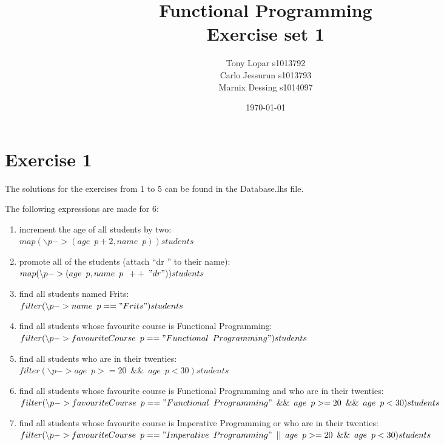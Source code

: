 \documentclass{article}
\begin{document}
\title{Functional Programming \\ Exercise set 1}
\date{\today}
\author{Tony Lopar s1013792 \\ Carlo Jessurun s1013793 \\ Marnix Dessing s1014097}
\maketitle

\section*{Exercise 1}
The solutions for the exercises from 1 to 5 can be found in the Database.lhs file.

The following expressions are made for 6:
\begin{enumerate}[label=\alph*)]
  \item increment the age of all students by two: \\
  $map (\backslash p -> (age \enspace p+2, name \enspace p)) students$
  \item promote all of the students (attach ``dr '' to their name): \\
  $map (\backslash p -> (age \enspace p, name \enspace p \enspace ++ \enspace "dr")) students$
  \item find all students named Frits: \\
  $filter(\backslash p -> name \enspace p == "Frits") students$
  \item find all students whose favourite course is Functional Programming: \\
  $filter(\backslash p -> favouriteCourse \enspace p == "Functional \enspace Programming") students$
  \item find all students who are in their twenties: \\
  $filter(\backslash p -> age \enspace p >= 20 \enspace \&\& \enspace age \enspace p < 30 ) students$
  \item find all students whose favourite course is Functional Programming and who are in their twenties: \\ $filter(\backslash p -> favouriteCourse \enspace p == "Functional \enspace Programming" \enspace \&\& \enspace age \enspace p >= 20 \enspace \&\& \enspace age \enspace p < 30) students$
  \item find all students whose favourite course is Imperative Programming or who are in their twenties: \\ $filter(\backslash p -> favouriteCourse \enspace p == "Imperative \enspace Programming" \enspace || \enspace age \enspace p >= 20 \enspace \&\& \enspace age \enspace p < 30) students$
\end{enumerate}
\end{document}

